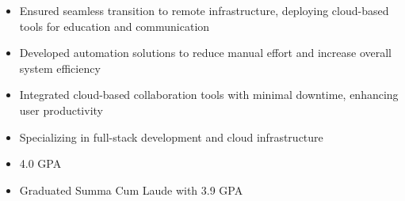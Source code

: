 \par\smallskip
\begin{minipage}{13.75cm}
  \begin{minipage}{6.5cm}
    \begin{itemize}
      \item Ensured seamless transition to remote infrastructure, deploying cloud-based tools for education and communication
      \item Developed automation solutions to reduce manual effort and increase overall system efficiency
    \end{itemize}
  \end{minipage}
  \hfill
  \begin{minipage}{6.5cm}
    \begin{itemize}
      \item Integrated cloud-based collaboration tools with minimal downtime, enhancing user productivity
    \end{itemize}
  \end{minipage}
\end{minipage}

\par\bigskip
{}
\begin{itemize}
  \item Specializing in full-stack development and cloud infrastructure
  \item 4.0 GPA
\end{itemize}
\divider

\begin{itemize}
  \item Graduated Summa Cum Laude with 3.9 GPA
\end{itemize}


